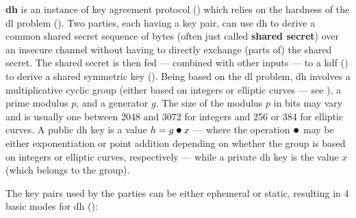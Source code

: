 \textbf{\gls{dh}} is an instance of key agreement protocol () which relies on the hardness of the \gls{dl} problem (). Two parties, each having a key pair, can use \gls{dh} to derive a common shared secret sequence of bytes (often just called \textbf{shared secret}) over an insecure channel without having to directly exchange (parts of) the shared secret. The shared secret is then fed --- combined with other inputs --- to a \gls{kdf} () to derive a shared symmetric key (). Being based on the \gls{dl} problem, \gls{dh} involves a multiplicative cyclic group (either based on integers or elliptic curves --- see ), a prime modulus $p$, and a generator $g$. The size of the modulus $p$ in bits may vary and is usually one between 2048 and 3072 for integers and 256 or 384 for elliptic curves. A public \gls{dh} key is a value $h = g \bigcdot x$ --- where the operation $\bigcdot$ may be either exponentiation or point addition depending on whether the group is based on integers or elliptic curves, respectively --- while a private \gls{dh} key is the value $x$ (which belongs to the group).


The key pairs used by the parties can be either ephemeral or static, resulting in 4 basic modes for \gls{dh} ():

